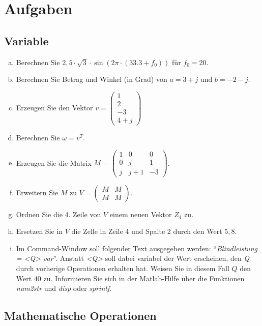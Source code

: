 \section{Aufgaben}

\subsection{Variable}

\begin{enumerate}[a)] %
    \item Berechnen Sie $2,5 \cdot \sqrt{3} \cdot \sin{(2\pi \cdot (33.3+f_0))}$ für $f_0 = 20$.
    \item Berechnen Sie Betrag und Winkel (in Grad) von $a=3+j$ und $b=-2-j$.
    \item Erzeugen Sie den Vektor $v= \begin{pmatrix}1\\2\\-3\\4+j\end{pmatrix}$
    \item Berechnen Sie $\omega = v^T$.
    \item Erzeugen Sie die Matrix $M=\begin{pmatrix}1&0&0\\0&j&1\\j&j+1&-3\end{pmatrix}$.
    \item Erweitern Sie $M$ zu $V = \begin{pmatrix}M&M\\M&M\end{pmatrix}$.
    \item Ordnen Sie die 4. Zeile von $V$ einem neuen Vektor $Z_4$ zu.
    \item Ersetzen Sie in $V$ die Zelle in Zeile 4 und Spalte 2 durch den Wert $5,8$.
    \item Im Command-Window soll folgender Text ausgegeben werden: \enquote{\emph{Blindleistung = <Q> var}}. Anstatt \emph{<Q>} soll dabei variabel der Wert erscheinen, den \emph{Q} durch vorherige Operationen erhalten hat. Weisen Sie in diesem Fall $Q$ den Wert $40$ zu. Informieren Sie sich in der Matlab-Hilfe über die Funktionen \emph{num2str} und \emph{disp} oder \emph{sprintf}.
\end{enumerate}

\subsection{Mathematische Operationen}

